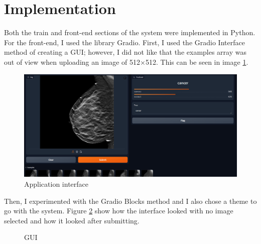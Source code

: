 \section{Implementation}
Both the train and front-end sections of the system were implemented in Python. For the front-end, I used the library Gradio. First, I used the Gradio Interface method of creating a GUI; however, I did not like that the examples array was out of view when uploading an image of 512$\times$512. This can be seen in image \ref{fig:fig15}.

\begin{figure}[H]
    \centering
    \includegraphics[width=0.75\linewidth]{figures/Figure16.png}
    \caption{Application interface}
    \label{fig:fig15}
\end{figure}

Then, I experimented with the Gradio Blocks method and I also chose a theme to go with the system. Figure \ref{fig:fig37} show how the interface looked with no image selected and how it looked after submitting.

\begin{figure}[H]
    \caption{GUI}
    \label{fig:fig37}
\end{figure}

